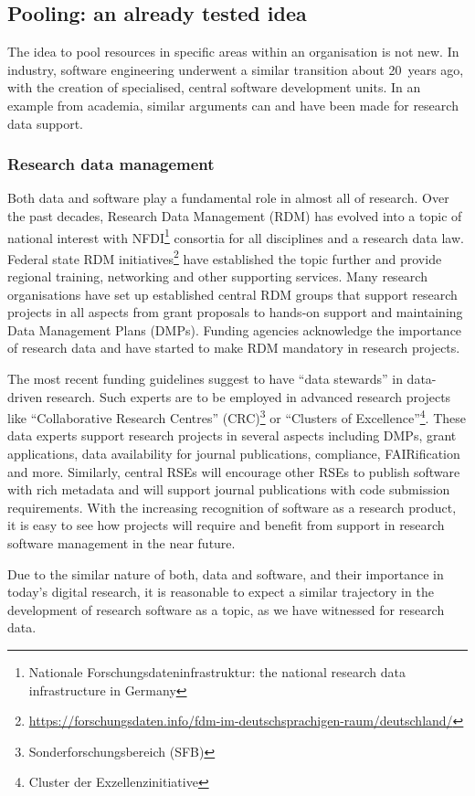 \documentclass[a4paper]{article}
\begin{document}
\subsection{Pooling: an already tested idea}
The idea to pool resources in specific areas within an organisation is not new.
In industry, software engineering underwent a similar transition about 20 years ago, with the creation of specialised, central software development units.
In an example from academia, similar arguments can and have been made for research data support.

\subsubsection{Research data management}
Both data and software play a fundamental role in almost all of research.
Over the past decades, Research Data Management (RDM) has evolved into a topic of national interest with NFDI\footnote{Nationale Forschungsdateninfrastruktur: the national research data infrastructure in Germany} consortia for all disciplines and a research data law.
Federal state RDM initiatives\footnote{\url{https://forschungsdaten.info/fdm-im-deutschsprachigen-raum/deutschland/}} have established the topic further and provide regional training, networking and other supporting services.
Many research organisations have set up established central RDM groups that support research projects in all aspects from grant proposals to hands-on support and maintaining Data Management Plans (DMPs).
Funding agencies acknowledge the importance of research data and have started to make RDM mandatory in research projects.

The most recent funding guidelines suggest to have “data stewards” in data-driven research.
Such experts are to be employed in advanced research projects like “Collaborative Research Centres” (CRC)\footnote{Sonderforschungsbereich (SFB)} or “Clusters of Excellence”\footnote{Cluster der Exzellenzinitiative}.
These data experts support research projects in several aspects including DMPs, grant applications, data availability for journal publications, compliance, FAIRification and more.
Similarly, central RSEs will encourage other RSEs to publish software with rich metadata and will support journal publications with code submission requirements.
With the increasing recognition of software as a research product, it is easy to see how projects will require and benefit from support in research software management in the near future.

Due to the similar nature of both, data and software, and their importance in today's digital research, it is reasonable to expect a similar trajectory in the development of research software as a topic, as we have witnessed for research data.
\end{document}
